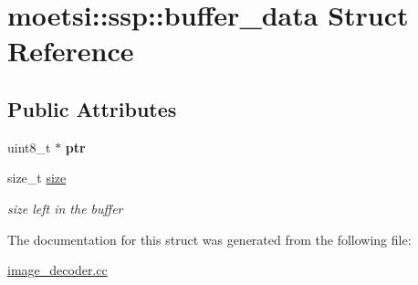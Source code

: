 \hypertarget{structmoetsi_1_1ssp_1_1buffer__data}{}\section{moetsi\+:\+:ssp\+:\+:buffer\+\_\+data Struct Reference}
\label{structmoetsi_1_1ssp_1_1buffer__data}
\subsection*{Public Attributes}
\begin{DoxyCompactItemize}
\item 
\mbox{\label{structmoetsi_1_1ssp_1_1buffer__data_a158675326710ea67b9e5eb78caefa6fc}} 
uint8\+\_\+t $\ast$ {\bfseries ptr}
\item 
\mbox{\label{structmoetsi_1_1ssp_1_1buffer__data_acd14a543f9ab4ccb7d5c9f8312861892}} 
size\+\_\+t \hyperlink{structmoetsi_1_1ssp_1_1buffer__data_acd14a543f9ab4ccb7d5c9f8312861892}{size}
\begin{DoxyCompactList}\small\item\em size left in the buffer \end{DoxyCompactList}\end{DoxyCompactItemize}


The documentation for this struct was generated from the following file\+:\begin{DoxyCompactItemize}
\item 
\hyperlink{image__decoder_8cc}{image\+\_\+decoder.\+cc}\end{DoxyCompactItemize}
